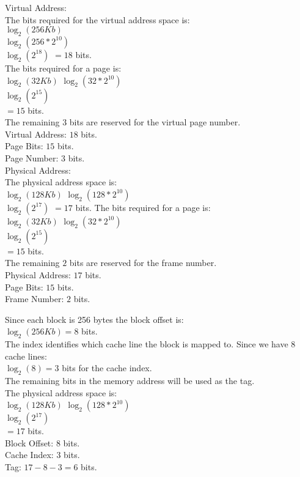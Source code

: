 \documentclass{article}
\begin{document}
{} {
     Virtual Address: \\
     The bits required for the virtual address space is: \\
     $\log_2(256Kb)$ \\
     $\log_2(256 * 2^{10})$ \\
     $\log_2(2^{18})$
     $ = 18$ bits. \\
     The bits required for a page is: \\
     $\log_2(32Kb)$
     $\log_2(32 * 2^{10})$ \\
     $\log_2(2^{15})$ \\
     $ = 15$ bits. \\
     The remaining $3$ bits are reserved for the virtual page number. \\
     Virtual Address: $18$ bits. \\
     Page Bits: $15$ bits. \\
     Page Number: $3$ bits. \\
     \linebreak
     Physical Address: \\
     The physical address space is: \\
     $\log_2(128Kb)$
     $\log_2(128 * 2^{10})$ \\
     $\log_2(2^{17})$
     $ = 17$ bits.
     The bits required for a page is: \\
     $\log_2(32Kb)$
     $\log_2(32 * 2^{10})$ \\
     $\log_2(2^{15})$ \\
     $ = 15$ bits. \\
     The remaining $2$ bits are reserved for the frame number. \\
     Physical Address: $17$ bits. \\
     Page Bits: $15$ bits. \\
     Frame Number: $2$ bits. \\
}

 {
     Since each block is 256 bytes the block offset is: \\
     $\log_2(256Kb) = 8$ bits. \\
     The index identifies which cache line the block is mapped to. Since we have 8 cache lines: \\
     $\log_2(8) = 3$ bits for the cache index. \\
     The remaining bits in the memory address will be used as the tag. \\
     The physical address space is: \\
     $\log_2(128Kb)$
     $\log_2(128 * 2^{10})$ \\
     $\log_2(2^{17})$ \\
     $ = 17$ bits. \\
     Block Offset: $8$ bits. \\
     Cache Index: $3$ bits. \\
     Tag: $17 - 8 - 3 = 6$ bits. \\
}
\end{document}

